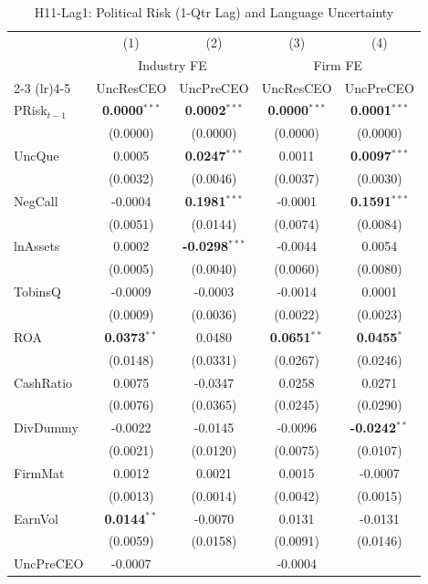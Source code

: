\documentclass[11pt,a4paper]{article}
\begin{document}
\begin{table}[htbp]
\centering
\caption{H11-Lag1: Political Risk (1-Qtr Lag) and Language Uncertainty}
\label{tab:h11_lag1}
\scriptsize
\begin{tabular}{lcccc}
\toprule
 & (1) & (2) & (3) & (4) \\
 & \multicolumn{2}{c}{Industry FE} & \multicolumn{2}{c}{Firm FE} \\
\cmidrule(lr){2-3} \cmidrule(lr){4-5}
 & UncResCEO & UncPreCEO & UncResCEO & UncPreCEO \\
\midrule
PRisk$_{t-1}$ & \textbf{0.0000}$^{***}$ & \textbf{0.0002}$^{***}$ & \textbf{0.0000}$^{***}$ & \textbf{0.0001}$^{***}$ \\
 & (0.0000) & (0.0000) & (0.0000) & (0.0000) \\
\midrule
UncQue & 0.0005 & \textbf{0.0247}$^{***}$ & 0.0011 & \textbf{0.0097}$^{***}$ \\
 & (0.0032) & (0.0046) & (0.0037) & (0.0030) \\
NegCall & -0.0004 & \textbf{0.1981}$^{***}$ & -0.0001 & \textbf{0.1591}$^{***}$ \\
 & (0.0051) & (0.0144) & (0.0074) & (0.0084) \\
lnAssets & 0.0002 & \textbf{-0.0298}$^{***}$ & -0.0044 & 0.0054 \\
 & (0.0005) & (0.0040) & (0.0060) & (0.0080) \\
TobinsQ & -0.0009 & -0.0003 & -0.0014 & 0.0001 \\
 & (0.0009) & (0.0036) & (0.0022) & (0.0023) \\
ROA & \textbf{0.0373}$^{**}$ & 0.0480 & \textbf{0.0651}$^{**}$ & \textbf{0.0455}$^{*}$ \\
 & (0.0148) & (0.0331) & (0.0267) & (0.0246) \\
CashRatio & 0.0075 & -0.0347 & 0.0258 & 0.0271 \\
 & (0.0076) & (0.0365) & (0.0245) & (0.0290) \\
DivDummy & -0.0022 & -0.0145 & -0.0096 & \textbf{-0.0242}$^{**}$ \\
 & (0.0021) & (0.0120) & (0.0075) & (0.0107) \\
FirmMat & 0.0012 & 0.0021 & 0.0015 & -0.0007 \\
 & (0.0013) & (0.0014) & (0.0042) & (0.0015) \\
EarnVol & \textbf{0.0144}$^{**}$ & -0.0070 & 0.0131 & -0.0131 \\
 & (0.0059) & (0.0158) & (0.0091) & (0.0146) \\
UncPreCEO & -0.0007 &  & -0.0004 &  \\

\end{tabular}
\end{table}
\end{document}
